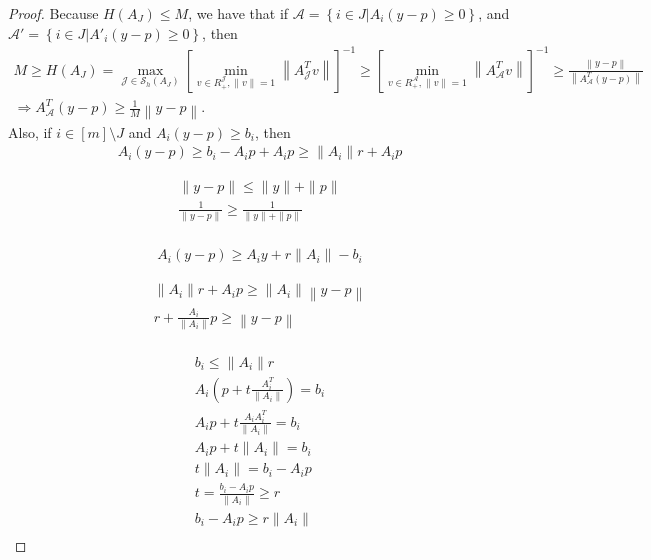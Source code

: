 \documentclass{article}
\theoremstyle{case}
\numberwithin{theorem}{subsection}
\begin{document}
\begin{proof}



Because $H\left(A_J\right) \le M$, we have that if 
$\mathcal A = \left\{i \in J | A_i\left(y - p\right) \ge 0 \right\}$, and
$\mathcal A' = \left\{i \in J | A'_i\left(y - p\right) \ge 0 \right\}$, then
\begin{align*}
M \ge H(A_J) 
= \max_{\mathcal J \in \mathcal S_h(A_J)} \left[\min_{v \in R^{\mathcal J}_+, \|v\| = 1}  \left\|A_{\mathcal J}^Tv\right\| \right]^{-1}
\ge \left[\min_{v \in R^{\mathcal A}_+, \|v\| = 1}  \left\|A_{\mathcal A}^Tv\right\| \right]^{-1}
\ge \frac{\left\|y - p\right\|}{\left\|A_{\mathcal A}^T (y - p) \right\|} \\
\Longrightarrow A_{\mathcal A}^T (y - p)  \ge \frac 1 M \left\|y - p\right\|.
\end{align*}
Also, if $i \in [m] \setminus J$ and $A_i(y - p) \ge b_i$, then
\begin{align*}
A_i \left(y - p\right) \ge b_i - A_ip + A_ip \ge \|A_i\| r + A_ip
\end{align*}


\begin{align*}
\| y - p \| \le \|y\| + \|p\| \\
\frac 1{\| y - p \|} \ge \frac 1 {\|y\| + \|p\|} \\
\end{align*}



\begin{align*}
A_i \left(y - p\right) \ge A_i y + r \|A_i\| - b_i 
\end{align*}



\begin{align*}
\|A_i\| r + A_ip \ge \|A_i\| \left\|y - p\right\| \\
r + \frac{A_i}{\|A_i\|}p \ge  \left\|y - p\right\| \\
\end{align*}

% 
% 


\begin{align*}
b_i \le \|A_i\| r \\
A_i \left(p + t \frac {A_i^T} {\|A_i\|} \right) = b_i \\
A_i p + t \frac {A_i A_i^T} {\|A_i\|} = b_i \\
A_i p + t \|A_i\| = b_i \\
t \|A_i\| = b_i - A_i p\\
t = \frac{b_i - A_i p}{\|A_i\|} \ge r \\
b_i - A_i p \ge r\|A_i\| \\
\end{align*}

\end{proof}
\end{document}
